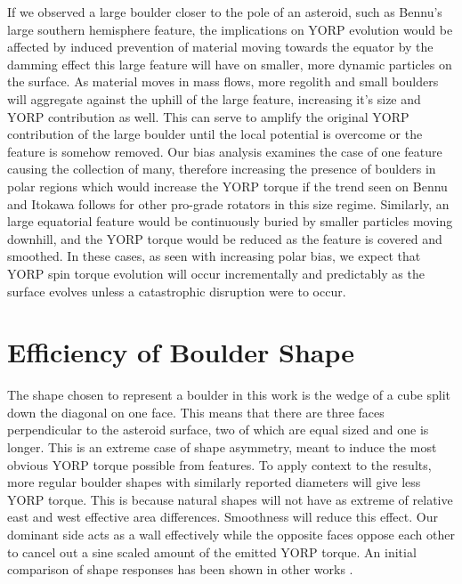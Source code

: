 If we observed a large boulder closer to the pole of an asteroid, such as Bennu's large southern hemisphere feature, the implications on YORP evolution would be affected by induced prevention of material moving towards the equator by the damming effect this large feature will have on smaller, more dynamic particles on the surface. As material moves in mass flows, more regolith and small boulders will aggregate against the uphill of the large feature, increasing it's size and YORP contribution as well. This can serve to amplify the original YORP contribution of the large boulder until the local potential is overcome or the feature is somehow removed. Our bias analysis examines the case of one feature causing the collection of many, therefore increasing the presence of boulders in polar regions which would increase the YORP torque if the trend seen on Bennu and Itokawa follows for other pro-grade rotators in this size regime. Similarly, an large equatorial feature would be continuously buried by smaller particles moving downhill, and the YORP torque would be reduced as the feature is covered and smoothed. In these cases, as seen with increasing polar bias, we expect that YORP spin torque evolution will occur incrementally and predictably as the surface evolves unless a catastrophic disruption were to occur. 


\section{Efficiency of Boulder Shape}

The shape chosen to represent a boulder in this work is the wedge of a cube split down the diagonal on one face. This means that there are three faces perpendicular to the asteroid surface, two of which are equal sized and one is longer. This is an extreme case of shape asymmetry, meant to induce the most obvious YORP torque possible from features. To apply context to the results, more regular boulder shapes with similarly reported diameters will give less YORP torque. This is because natural shapes will not have as extreme of relative east and west effective area differences. Smoothness will reduce this effect. Our dominant side acts as a wall effectively while the opposite faces oppose each other to cancel out a sine scaled amount of the emitted YORP torque. An initial comparison of shape responses has been shown in other works \citep{Golubov2017}. 






